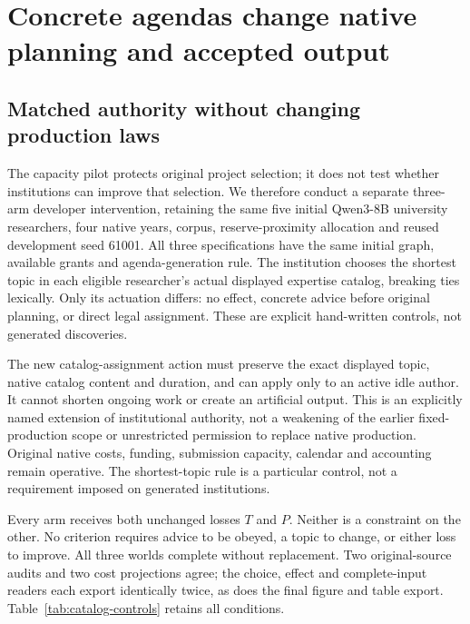 \section{Concrete agendas change native planning and accepted output}
\label{sec:native-catalog}
\subsection{Matched authority without changing production laws}
The capacity pilot protects original project selection; it does not test
whether institutions can improve that selection. We therefore conduct a
separate three-arm developer intervention, retaining the same five initial
Qwen3-8B university researchers, four native years, corpus, reserve-proximity
allocation and reused development seed 61001. All three specifications have
the same initial graph, available grants and agenda-generation rule. The
institution chooses the shortest topic in each eligible researcher's actual
displayed expertise catalog, breaking ties lexically. Only its actuation differs:
no effect, concrete advice before original planning, or direct legal assignment.
These are explicit hand-written controls, not generated discoveries.

The new catalog-assignment action must preserve the exact displayed topic,
native catalog content and duration, and can apply only to an active idle
author. It cannot shorten ongoing work or create an artificial output. This
is an explicitly named extension of institutional authority, not a weakening
of the earlier fixed-production scope or unrestricted permission to replace
native production. Original native costs, funding, submission capacity,
calendar and accounting remain operative. The shortest-topic rule is a
particular control, not a requirement imposed on generated institutions.

Every arm receives both unchanged losses $T$ and $P$. Neither is a constraint
on the other. No criterion requires advice to be obeyed, a topic to change,
or either loss to improve. All three worlds complete without replacement.
Two original-source audits and two cost projections agree; the choice, effect
and complete-input readers each export identically twice, as does the final
figure and table export. Table~\ref{tab:catalog-controls} retains all conditions.

